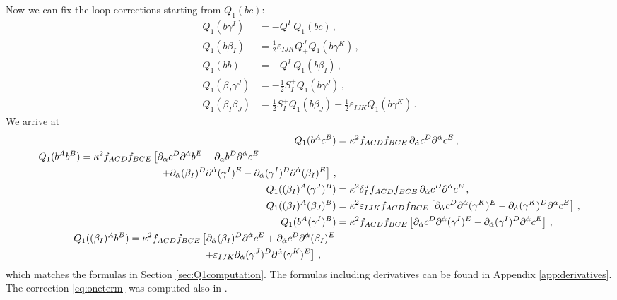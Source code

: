 \documentclass[11pt]{article}
\begin{document}
Now we can fix the loop corrections starting from $Q_1(bc)$:
\begin{align}
    Q_1(b\gamma^I) 
        &= - Q_+^I Q_1 (bc)\,, \\
    Q_1(b\beta_I) 
        &= \frac{1}{2} \varepsilon_{IJK} Q^J_+ Q_1 (b\gamma^K)\,, \\
    Q_1(bb) 
        &= - Q^I_+ Q_1 (b\beta_I)\,,  \\
    Q_1(\beta_I\gamma^J) 
        &= -\frac{1}{2} S^+_I Q_1 (b\gamma^J)\,, \\
    Q_1(\beta_I\beta_J) 
        &= \frac{1}{2} S^+_I Q_1(b\beta_J) - \frac{1}{2} \varepsilon_{IJK}Q_1(b\gamma^K) \,.
\end{align}
We arrive at
\begin{align}
     Q_1 (b^A c^B ) 
        &=  \kappa^2 f_{ACD}f_{BCE} \, \partial_{\dot\alpha} c^D\partial^{\dot\alpha} c^E \,, \\
    \begin{split}
     Q_1(b^A b^B) 
        &= \kappa^2 f_{ACD}f_{BCE} \left[ \partial_{\dot\alpha} c^D \partial^{\dot\alpha} b^E -\partial_{\dot\alpha} b^D\partial^{\dot\alpha} c^E \right.\\
        &\hphantom{=2\kappa^2 f_{ACD}f_{BCE}[]}\left. +\partial_{\dot\alpha}(\beta_I)^D\partial^{\dot\alpha}(\gamma^I)^E - \partial_{\dot\alpha} (\gamma^I)^D\partial^{\dot\alpha}(\beta_I)^E  \right]\,,
    \end{split}\\
     Q_1 ((\beta_I)^A (\gamma^J)^B ) 
        &=  \kappa^2 \delta^J_I f_{ACD}f_{BCE} \, \partial_{\dot\alpha} c^D\partial^{\dot\alpha} c^E \,,  \label{eq:oneterm} \\
     Q_1 ((\beta_I)^A (\beta_J)^B ) 
        &= \kappa^2 \varepsilon_{IJK} f_{ACD}f_{BCE} \left[ \partial_{\dot\alpha}c^D \partial^{\dot\alpha}(\gamma^K)^E -\partial_{\dot\alpha} (\gamma^K)^D \partial^{\dot\alpha} c^E \right] \,,\\
    Q_1(b^A(\gamma^I)^B) 
        &= \kappa^2 f_{ACD}f_{BCE} \left[\partial_{\dot\alpha} c^D \partial^{\dot\alpha} (\gamma^I)^E-\partial_{\dot\alpha} (\gamma^I)^D \partial^{\dot\alpha} c^E\right] \,, \\
    \begin{split}
    Q_1((\beta_I)^A b^B) 
        &= \kappa^2 f_{ACD}f_{BCE} \left[ \partial_{\dot\alpha} (\beta_I)^D \partial^{\dot\alpha} c^E + \partial_{\dot\alpha} c^D \partial^{\dot\alpha} (\beta_I)^E\right.\\
        &\hphantom{= 2\kappa^2 f_{ACD}f_{BCE}}\left.+\varepsilon_{IJK}\partial_{\dot\alpha} (\gamma^J)^D \partial^{\dot\alpha}(\gamma^K)^E \right] \, ,
    \end{split}
\end{align}
which matches the formulas in Section \ref{sec:Q1computation}. The formulas including derivatives can be found in Appendix \ref{app:derivatives}. The correction \eqref{eq:oneterm} was computed also in \cite{Choi:2025bhi}. 
\end{document}
